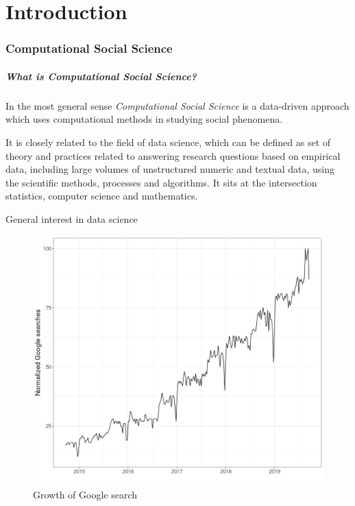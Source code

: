 \part[Introduction]{Introduction}
\frame{\partpage}

\section[CSS]{Computational Social Science}

\begin{frame}
    \frametitle{What is Computational Social Science?}
    \begin{block}{}
        In the most general sense \emph{Computational Social Science} is a data-driven approach which uses computational methods in studying social phenomena.
    \end{block}
    \begin{block}{}
        It is closely related to the field of data science, which can be
        defined as set of theory and practices related to answering research questions
        based on empirical data, including large volumes of unstructured numeric
        and textual data, using the scientific methods, processes and algorithms.
        It sits at the intersection statistics, computer science and mathematics.
    \end{block}
\end{frame}

\begin{frame}{General interest in data science}
    \begin{figure}
    \caption{Growth of Google search}
    \includegraphics[width = .8\framewidth]{png/ds-searches.png}

    \end{figure}
\end{frame}

